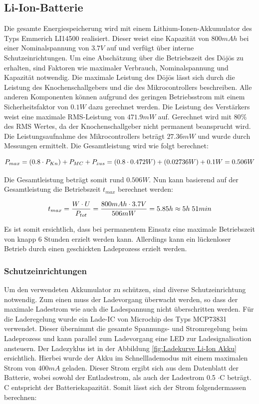 \subsection{Li-Ion-Batterie}\label{sec:energiespeicher}

Die gesamte Energiespeicherung wird mit einem Lithium-Ionen-Akkumulator des Typs Emmerich LI14500 realisiert. Dieser weist eine Kapazität von $800mAh$ bei einer Nominalspannung von $3.7V$ auf und verfügt über interne Schutzeinrichtungen. Um eine Abschätzung über die Betriebszeit des Dōjōs zu erhalten, sind Faktoren wie maximaler Verbrauch, Nominalspannung und Kapazität notwendig. Die maximale Leistung des Dōjōs lässt sich durch die Leistung des Knochenschallgebers und die des Mikrocontrollers beschreiben. Alle anderen Komponenten können aufgrund des geringen Betriebsstrom mit einem Sicherheitsfaktor von $0.1W$ dazu gerechnet werden. Die Leistung des Verstärkers weist eine maximale RMS-Leistung von $471.9mW$ auf. Gerechnet wird mit $80\%$ des RMS Wertes, da der Knochenschallgeber nicht permanent beansprucht wird. Die Leistungsaufnahme des Mikrocontrollers beträgt $27.36mW$ und wurde durch Messungen ermittelt. Die Gesamtleistung wird wie folgt berechnet:

\begin{equation}
\centering
P_{max}=\left(0.8\cdot P_{Kn}\right)+P_{MC}+P_{zus}=(0.8\cdot 0.472W)+(0.02736W)+0.1W=0.506W
\label{eq:MaxLeistung}
\end{equation}

Die Gesamtleistung beträgt somit rund $0.506 W$. Nun kann basierend auf der Gesamtleistung die Betriebszeit $t_{max}$ berechnet werden:

\begin{equation}
\centering
t_{max}=\frac{W\cdot U}{P_{tot}}=\frac{800mAh \cdot 3.7V}{506mW}=5.85h\approx 5h \thickspace 51min
\label{eq:Betriebszeit}
\end{equation}

Es ist somit ersichtlich, dass bei permanentem Einsatz eine maximale Betriebszeit von knapp 6 Stunden erzielt werden kann. Allerdings kann ein lückenloser Betrieb durch einen geschickten Ladeprozess erzielt werden.

\subsubsection*{Schutzeinrichtungen}\label{sec:schutzeinrichtung}
Um den verwendeten Akkumulator zu schützen, sind diverse Schutzeinrichtung notwendig. Zum einen muss der Ladevorgang überwacht werden, so dass der maximale Ladestrom wie auch die Ladespannung nicht überschritten werden. Für die Laderegelung wurde ein Lade-IC von Microchip des Typs MCP73831 verwendet. Dieser übernimmt die gesamte Spannungs- und Stromregelung beim Ladeprozess und kann parallel zum Ladevorgang eine LED zur Ladesignalisation ansteuern. Der Ladezyklus ist in der Abbildung  \ref{fig:Ladekurve Li-Ion Akku} ersichtlich. Hierbei wurde der Akku im Schnelllademodus mit einem maximalen Strom von $400mA$ geladen. Dieser Strom ergibt sich aus dem Datenblatt der Batterie, wobei sowohl der Entladestrom, als auch der Ladestrom 0.5 $\cdot$C beträgt. C entspricht der Batteriekapazität. Somit lässt sich der Strom folgendermassen berechnen:

